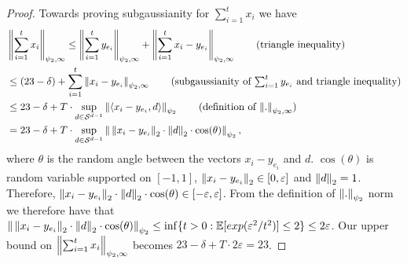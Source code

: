 \begin{proof}
    Towards proving subgaussianity for $\sum_{i=1}^t x_i$ we have
    \begin{align*}
        &\norm{\sum_{i=1}^t x_i}_{\psi_2, \infty} \leq \norm{\sum_{i=1}^t y_{e_i}}_{\psi_2, \infty} + \norm{\sum_{i=1}^t x_i - y_{e_i}}_{\psi_2, \infty} \tag{triangle inequality}\\
        & \leq (23 - \delta) + \sum_{i=1}^t \norm{x_i - y_{e_i}}_{\psi_2, \infty} \tag{subgaussianity of $\sum_{i=1}^t y_{e_i}$ and triangle inequality}\\
        & \leq 23 - \delta + T \cdot \sup_{d \in \Sph^{d-1}} \norm{\langle x_i - y_{e_i}, d \rangle}_{\psi_2} \tag{definition of $\norm{.}_{\psi_2, \infty}$}\\
        &= 23 - \delta + T \cdot \sup_{d \in \Sph^{d-1}} \norm{ \, \norm{x_i - y_{e_i}}_2 \cdot \norm{d}_2 \cdot \cos(\theta) }_{\psi_2},
    \end{align*}
    where $\theta$ is the random angle between the vectors $x_i - y_{e_i}$ and $d$.  $\cos(\theta)$ is random variable supported on $[-1,1]$, $\left\lVert x_i - y_{e_i}\right\rVert_2 \in [0,\varepsilon]$ and $\left\lVert d\right\rVert_2 = 1$. Therefore, $\left\lVert x_i - y_{e_i}\right\rVert_2 \cdot \left\lVert d\right\rVert_2 \cdot \cos(\theta) \in [-\varepsilon,\varepsilon]$. From the definition of $\left\lVert.\right\rVert_{\psi_2}$ norm we therefore have that $\left\lVert \, \left\lVert x_i - y_{e_i}\right\rVert_2 \cdot \left\lVert d\right\rVert_2 \cdot \cos(\theta) \right\rVert_{\psi_2} \leq \inf\{ t > 0: \operatorname*{\mathbb{E}}[exp(\varepsilon^2/t^2)] \leq 2 \} \leq 2 \varepsilon$. Our upper bound on $\left\lVert\sum_{i=1}^t x_i\right\rVert_{\psi_2, \infty}$ becomes $23 - \delta + T \cdot 2 \varepsilon = 23$. %
\end{proof}



